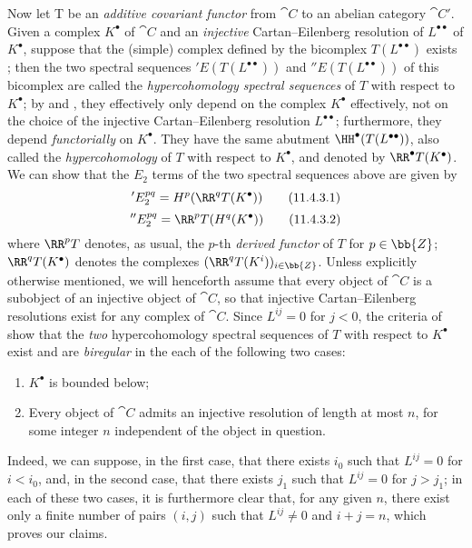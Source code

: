 \begin{env}[11.4.3]
\label{0.11.4.3}
Now let T be an \emph{additive covariant functor} from $\cat{C}$ to an abelian category $\cat{C'}$.
Given a complex $K^\bullet$ of $\cat{C}$ and an \emph{injective} Cartan--Eilenberg resolution of $L^{\bullet\bullet}$ of $K^{\bullet}$, suppose that the (simple) complex defined by the bicomplex $T(L^{\bullet\bullet})$ exists ;
then the two spectral sequences $'E(T(L^{\bullet\bullet}))$ and $''E(T(L^{\bullet\bullet}))$ of this bicomplex are called the \emph{hypercohomology spectral sequences} of $T$ with respect to $K^\bullet$;
by  and , they effectively only depend on the complex $K^\bullet$ effectively, not on the choice of the injective Cartan--Eilenberg resolution $L^{\bullet\bullet}$;
furthermore, they depend \emph{functorially} on $K^\bullet$.
They have the same abutment $\HH^\bullet(T(L^{\bullet\bullet}))$, also called the \emph{hypercohomology} of $T$ with respect to $K^\bullet$, and denoted by $\RR^\bullet T(K^\bullet)$.
We can show that the $E_2$ terms of the two spectral sequences above are given by 
\[
\label{0.11.4.3.1}
  'E_2^{pq}
  = H^p(\RR^q T(K^\bullet))
\tag{11.4.3.1}
\]
\[
\label{0.11.4.3.2}
  ''E_2^{pq}
  = \RR^p T(H^q(K^\bullet))
\tag{11.4.3.2}
\]
where $\RR^p T$ denotes, as usual, the $p$-th \emph{derived functor} of $T$ for $p\in\bb{Z}$;
$\RR^q T(K^\bullet)$ denotes the complexes $(\RR^q T(K^i))_{i\in\bb{Z}}$.
Unless explicitly otherwise mentioned, we will henceforth assume that every object of $\cat{C}$ is a subobject of an injective object of $\cat{C}$, so that injective Cartan--Eilenberg resolutions exist for any complex of $\cat{C}$.
Since $L^{ij}=0$ for $j<0$, the criteria of  show that the \emph{two} hypercohomology spectral sequences of $T$ with respect to $K^\bullet$ exist and are \emph{biregular} in the each of the following two cases:
\begin{enumerate}
  \item $K^\bullet$ is bounded below;
  \item Every object of $\cat{C}$ admits an injective resolution of length at most $n$, for some integer $n$ independent of the object in question.
\end{enumerate}
Indeed, we can suppose, in the first case, that  there exists $i_0$ such that $L^{ij}=0$ for $i<i_0$, and, in the second case, that there exists $j_1$ such that $L^{ij}=0$ for $j>j_1$;
in each of these two cases, it is furthermore clear that, for any given $n$, there exist only a finite number of pairs $(i,j)$ such that $L^{ij}\neq 0$ and $i+j=n$, which proves our claims.


\end{env}
